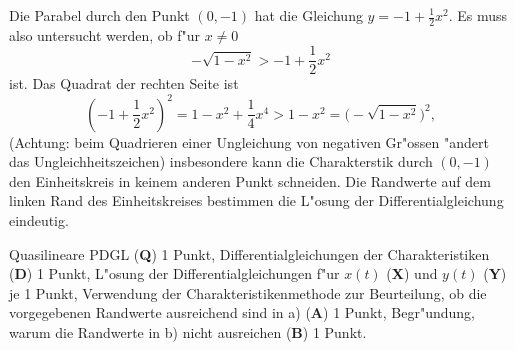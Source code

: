 \begin{loesung}
Die Parabel durch den Punkt $(0,-1)$ hat die Gleichung $y=-1+\frac12x^2$.
Es muss also untersucht werden, ob f"ur $x\ne 0$
\[
-\sqrt{1-x^2} > -1+\frac12x^2
\]
ist. Das Quadrat der rechten Seite ist
\[
(-1+\frac12x^2)^2=1-x^2 +\frac14x^4 > 1-x^2=\bigl(-\sqrt{1-x^2}\bigr)^2,
\]
(Achtung: beim Quadrieren einer Ungleichung von negativen Gr"ossen "andert das
Ungleichheitszeichen)
insbesondere kann die Charakterstik durch $(0,-1)$ den Einheitskreis
in keinem anderen Punkt schneiden.
Die Randwerte auf dem linken Rand des Einheitskreises
bestimmen die L"osung der Differentialgleichung eindeutig.
\end{loesung}

\begin{bewertung}
Quasilineare PDGL ({\bf Q}) 1 Punkt,
Differentialgleichungen der Charakteristiken ({\bf D}) 1 Punkt,
L"osung der Differentialgleichungen f"ur $x(t)$ ({\bf X})
und $y(t)$ ({\bf Y}) je 1 Punkt,
Verwendung der Charakteristikenmethode zur Beurteilung, ob die
vorgegebenen Randwerte ausreichend sind in a) ({\bf A}) 1 Punkt,
Begr"undung, warum die Randwerte in b) nicht ausreichen ({\bf B}) 1 Punkt.
\end{bewertung}
